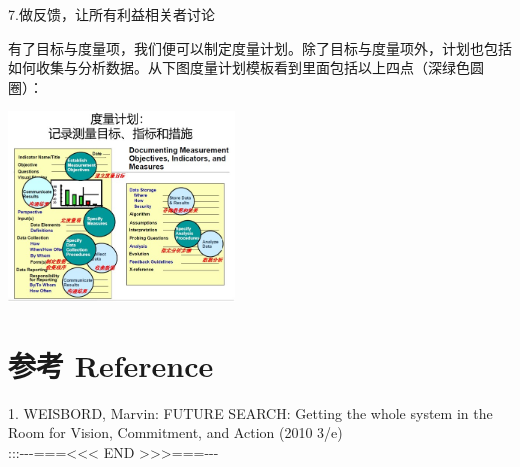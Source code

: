 7.做反馈，让所有利益相关者讨论

有了目标与度量项，我们便可以制定度量计划。除了目标与度量项外，计划也包括如何收集与分析数据。从下图度量计划模板看到里面包括以上四点（深绿色圆圈）：


\includegraphics[width=6cm]{13_MA_plan_Screenshot_2023-10-26_211815.jpg}

\hypertarget{ux53c2ux8003-reference}{%
\section{参考 Reference}\label{ux53c2ux8003-reference}}

1. WEISBORD, Marvin: FUTURE SEARCH: Getting the whole system in the Room
for Vision, Commitment, and Action (2010 3/e)\\
:::-\/-\/-===\textless{}\textless{}\textless{} END
\textgreater{}\textgreater{}\textgreater{}===-\/-\/-



